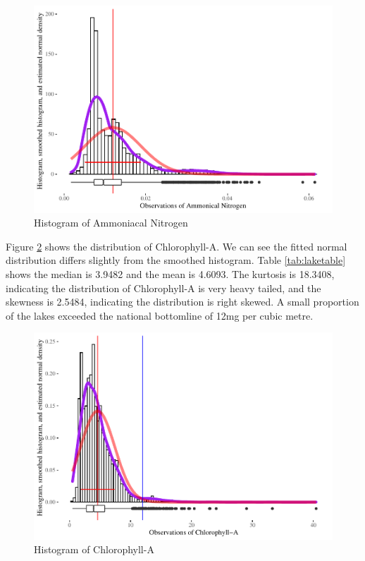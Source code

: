 \documentclass[
]{article}
\begin{document}
\begin{figure}
\centering
\includegraphics{Final-Report_files/figure-latex/nh4nhist-1.pdf}
\caption{\label{fig:nh4nhist}Histogram of Ammoniacal Nitrogen}
\end{figure}

Figure \ref{fig:chlahist} shows the distribution of Chlorophyll-A. We can see the fitted normal distribution differs slightly from the smoothed histogram. Table \ref{tab:laketable} shows the median is 3.9482 and the mean is 4.6093. The kurtosis is 18.3408, indicating the distribution of Chlorophyll-A is very heavy tailed, and the skewness is 2.5484, indicating the distribution is right skewed. A small proportion of the lakes exceeded the national bottomline of 12mg per cubic metre.

\begin{figure}
\centering
\includegraphics{Final-Report_files/figure-latex/chlahist-1.pdf}
\caption{\label{fig:chlahist}Histogram of Chlorophyll-A}
\end{figure}
\end{document}
